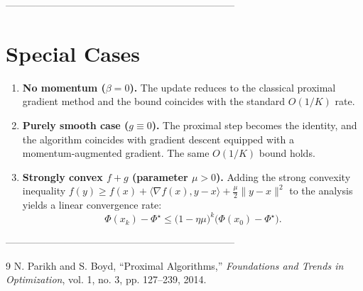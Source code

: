 \documentclass{article}
\begin{document}
---------------------------------------------------------------------

\section*{Special Cases}
\begin{enumerate}
\item \textbf{No momentum ($\beta=0$).} The update reduces to the classical proximal gradient method and the bound coincides with the standard $O(1/K)$ rate.
\item \textbf{Purely smooth case ($g\equiv0$).} The proximal step becomes the identity, and the algorithm coincides with gradient descent equipped with a momentum‑augmented gradient. The same $O(1/K)$ bound holds.
\item \textbf{Strongly convex $f+g$ (parameter $\mu>0$).} Adding the strong convexity inequality 
$f(y)\ge f(x)+\langle\nabla f(x),y-x\rangle+\frac{\mu}{2}\|y-x\|^{2}$
to the analysis yields a linear convergence rate:
\[
\Phi(x_k)-\Phi^{\star}\le\bigl(1-\eta\mu\bigr)^{k}\bigl(\Phi(x_0)-\Phi^{\star}\bigr).
\]
\end{enumerate}

---------------------------------------------------------------------

\begin{thebibliography}{9}
N. Parikh and S. Boyd, ``Proximal Algorithms,'' \emph{Foundations and Trends in Optimization}, vol. 1, no. 3, pp. 127–239, 2014.
\end{thebibliography}
\end{document}
